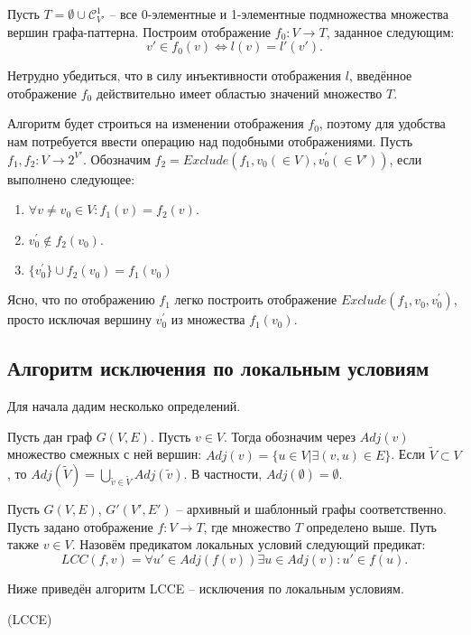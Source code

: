 Пусть $T = \emptyset \cup \mathcal{C}_{V'}^1$ -- все 0-элементные и 1-элементные подмножества множества вершин графа-паттерна. Построим отображение $f_0 : V \to T$, заданное следующим:
\begin{equation}
v' \in f_0(v) \Leftrightarrow l(v) = l'(v').
\end{equation}

Нетрудно убедиться, что в силу инъективности отображения $l$, введённое отображение $f_0$ действительно имеет областью значений множество $T$.

Алгоритм будет строиться на изменении отображения $f_0$, поэтому для удобства нам потребуется ввести операцию над подобными отображениями. Пусть $f_1, f_2 : V \to 2^{V'}$. Обозначим $f_2 = Exclude(f_1, v_0 (\in V), v^{\prime}_0 (\in V'))$, если выполнено следующее:
\begin{enumerate}
	\item $\forall v \ne v_0 \in V: f_1(v) = f_2(v)$.
	\item $v^{\prime}_0 \notin f_2(v_0)$.
	\item $\{v^{\prime}_0\} \cup f_2(v_0) = f_1(v_0)$
\end{enumerate}

Ясно, что по отображению $f_1$ легко построить отображение $Exclude(f_1, v_0, v^{\prime}_0)$, просто исключая вершину $v^{\prime}_0$ из множества $f_1(v_0)$.

\subsection{Алгоритм исключения по локальным условиям}

Для начала дадим несколько определений.

\begin{defn}
	Пусть дан граф $G(V, E)$. Пусть $v \in V$. Тогда обозначим через $Adj(v)$ множество смежных с ней вершин: $Adj(v) = \{u \in V | \exists (v, u) \in E \}$. Если $\widetilde{V} \subset V$, то $Adj(\widetilde{V}) = \bigcup\limits_{\widetilde{v} \in \widetilde{V}} Adj(\widetilde{v})$. В частности, $Adj(\emptyset) = \emptyset$.
\end{defn} 

\begin{defn}
	Пусть $G(V, E)$, $G'(V', E')$ -- архивный и шаблонный графы соответственно. Пусть задано отображение $f : V \to T$, где множество $T$ определено выше. Путь также $v \in V$. Назовём предикатом локальных условий следующий предикат:
	\begin{equation}
		LCC(f, v) = \forall u' \in Adj(f(v)) \exists u \in Adj(v) : u' \in f(u).
	\end{equation} 
\end{defn} 

Ниже приведён алгоритм LCCE -- исключения по локальным условиям.
\begin{algorithm}
	\Large
	\Begin(LCCE){
	}
\end{algorithm}

